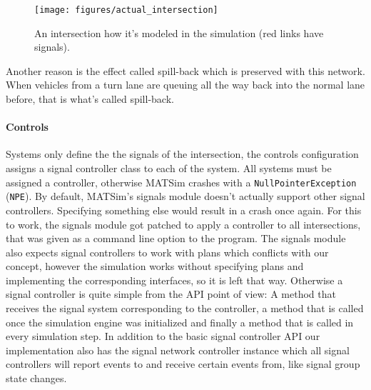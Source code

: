 \begin{figure}[ht!]
	\centering
	\texttt{[image: figures/actual\_intersection]}
	\caption{An intersection how it's modeled in the simulation (red links have signals).}
	\label{actual_intersection}
\end{figure}

Another reason is the effect called spill-back which is preserved with this network. When vehicles from a turn lane are queuing all the way back into the normal lane before, that is what's called spill-back. \cite{matsim}

\paragraph{Controls} Systems only define the the signals of the intersection, the controls configuration assigns a signal controller class to each of the system. All systems must be assigned a controller, otherwise MATSim crashes with a \texttt{NullPointerException} (\texttt{NPE}). By default, MATSim's signals module doesn't actually support other signal controllers. Specifying something else would result in a crash once again. For this to work, the signals module got patched to apply a controller to all intersections, that was given as a command line option to the program. The signals module also expects signal controllers to work with plans which conflicts with our concept, however the simulation works without specifying plans and implementing the corresponding interfaces, so it is left that way. Otherwise a signal controller is quite simple from the API point of view: A method that receives the signal system corresponding to the controller, a method that is called once the simulation engine was initialized and finally a method that is called in every simulation step. In addition to the basic signal controller API our implementation also has the signal network controller instance which all signal controllers will report events to and receive certain events from, like signal group state changes.

